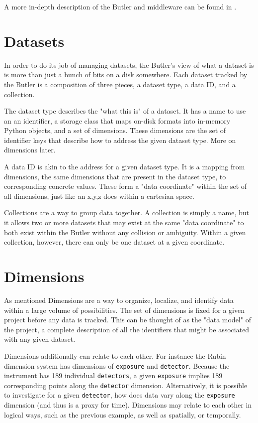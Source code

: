 A more in-depth description of the Butler and middleware can be found in \citet{2022SPIE12189E..11J}.

\section{Datasets}
In order to do its job of managing datasets, the Butler's view of what a dataset is is more than just a bunch of bits on a disk somewhere. Each dataset tracked by the Butler is a composition of three pieces, a dataset type, a data ID, and a collection.

The dataset type describes the "what this is" of a dataset. It has a name to use an an identifier, a storage class that maps on-disk formats into in-memory Python objects, and a set of dimensions. These dimensions are the set of identifier keys that describe how to address the given dataset type. More on dimensions later.

A data ID is akin to the address for a given dataset type. It is a mapping from dimensions, the same dimensions that are present in the dataset type, to corresponding concrete values. These form a "data coordinate" within the set of all dimensions, just like an x,y,z does within a cartesian space.

Collections are a way to group data together. A collection is simply a name, but it allows two or more datasets that may exist at the same "data coordinate" to both exist within the Butler without any collision or ambiguity. Within a given collection, however, there can only be one dataset at a given coordinate.

\section{Dimensions}
As mentioned Dimensions are a way to organize, localize, and identify data within a large volume of possibilities. The set of dimensions is fixed for a given project before any data is tracked. This can be thought of as the "data model" of the project, a complete description of all the identifiers that might be associated with any given dataset.

Dimensions additionally can relate to each other. For instance the Rubin dimension system has dimensions of \texttt{exposure} and \texttt{detector}. Because the instrument has 189 individual \texttt{detectors}, a given \texttt{exposure} implies 189 corresponding points along the \texttt{detector} dimension. Alternatively, it is possible to investigate for a given \texttt{detector}, how does data vary along the \texttt{exposure} dimension (and thus is a proxy for time). Dimensions may relate to each other in logical ways, such as the previous example, as well as spatially, or temporally.

